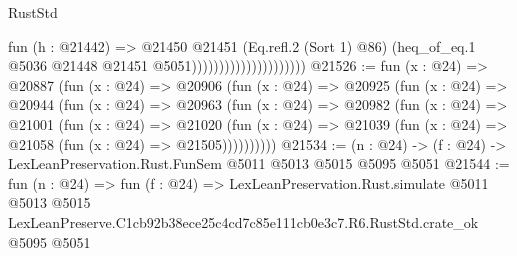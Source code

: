 \begin{lexlean}{RustStd}
\begin{coremodule}
                                          fun (h : @21442) =>
                                          @21450
                                            @21451
                                            (Eq.refl.{2} (Sort 1) @86)
                                            (heq_of_eq.{1}
                                              @5036
                                              @21448
                                              @21451
                                              @5051)))))))))))))))))))))
@21526 := fun (x : @24) =>
  @20887
    (fun (x : @24) =>
    @20906
      (fun (x : @24) =>
      @20925
        (fun (x : @24) =>
        @20944
          (fun (x : @24) =>
          @20963
            (fun (x : @24) =>
            @20982
              (fun (x : @24) =>
              @21001
                (fun (x : @24) =>
                @21020
                  (fun (x : @24) =>
                  @21039 (fun (x : @24) => @21058 (fun (x : @24) => @21505))))))))))
@21534 := (n : @24) -> (f : @24) -> LexLeanPreservation.Rust.FunSem @5011 @5013 @5015 @5095 @5051
@21544 := fun (n : @24) =>
  fun (f : @24) =>
  LexLeanPreservation.Rust.simulate
    @5011
    @5013
    @5015
    LexLeanPreserve.C1cb92b38ece25c4cd7c85e111cb0e3c7.R6.RustStd.crate_ok
    @5095
    @5051
\end{coremodule}
\end{lexlean}
